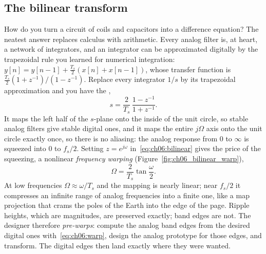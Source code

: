 
\subsection{The bilinear transform}

How do you turn a circuit of coils and capacitors into a difference equation? The neatest answer
replaces calculus with arithmetic. Every analog filter is, at heart, a network of integrators, and
an integrator can be approximated digitally by the trapezoidal rule you learned for numerical
integration: $y[n]=y[n-1]+\tfrac{T_s}{2}(x[n]+x[n-1])$, whose transfer function is
$\tfrac{T_s}{2}(1+z^{-1})/(1-z^{-1})$. Replace every integrator $1/s$ by its trapezoidal
approximation and you have the ,
\begin{equation}
s=\frac{2}{T_s}\,\frac{1-z^{-1}}{1+z^{-1}}.
\label{eq:ch06:bilinear}
\end{equation}
It maps the left half of the $s$-plane onto the inside of the unit circle, so
stable analog filters give stable digital ones, and it maps the entire $j\Omega$ axis onto the unit
circle exactly once, so there is no aliasing: the analog response from $0$ to $\infty$ is squeezed
into $0$ to $f_s/2$. Setting $z=e^{j\omega}$ in~\eqref{eq:ch06:bilinear} gives the price of the
squeezing, a nonlinear \emph{frequency warping} (Figure~\ref{fig:ch06_bilinear_warp}),
\begin{equation}
\Omega=\frac{2}{T_s}\tan\frac{\omega}{2}.
\label{eq:ch06:warp}
\end{equation}
At low frequencies $\Omega\approx\omega/T_s$ and the mapping is nearly linear; near $f_s/2$ it
compresses an infinite range of analog frequencies into a finite one, like a map projection that
crams the poles of the Earth into the edge of the page. Ripple heights, which are magnitudes, are
preserved exactly; band edges are not. The designer therefore \emph{pre-warps}: compute the analog
band edges from the desired digital ones with~\eqref{eq:ch06:warp}, design the analog prototype for
those edges, and transform. The digital edges then land exactly where they were wanted.


